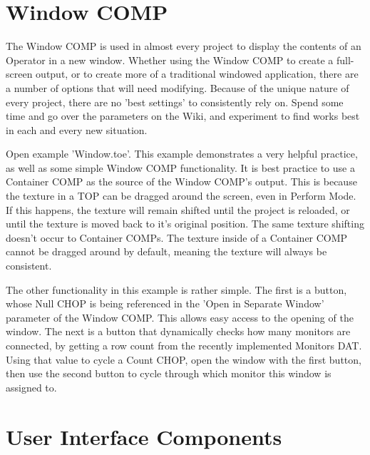 
\section{Window COMP}

\begin{fullwidth}
The Window COMP is used in almost every project to display the contents of an Operator in a new window. Whether using the Window COMP to create a full-screen output, or to create more of a traditional windowed application, there are a number of options that will need modifying. Because of the unique nature of every project, there are no 'best settings' to consistently rely on. Spend some time and go over the parameters on the Wiki, and experiment to find works best in each and every new situation.

Open example 'Window.toe'. This example demonstrates a very helpful practice, as well as some simple Window COMP functionality. It is best practice to use a Container COMP as the source of the Window COMP's output. This is because the texture in a TOP can be dragged around the screen, even in Perform Mode. If this happens, the texture will remain shifted until the project is reloaded, or until the texture is moved back to it's original position. The same texture shifting doesn't occur to Container COMPs. The texture inside of a Container COMP cannot be dragged around by default, meaning the texture will always be consistent.

The other functionality in this example is rather simple. The first is a button, whose Null CHOP is being referenced in the 'Open in Separate Window' parameter of the Window COMP. This allows easy access to the opening of the window. The next is a button that dynamically checks how many monitors are connected, by getting a row count from the recently implemented Monitors DAT. Using that value to cycle a Count CHOP, open the window with the first button, then use the second button to cycle through which monitor this window is assigned to.
\end{fullwidth}


\section{User Interface Components}

